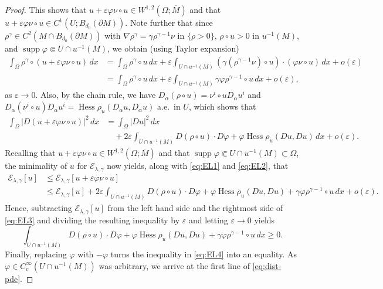 \documentclass[11pt]{amsart}
\newcommand{\cE}{{\mathcal E}}
\newcommand{\e}{\varepsilon}
\newcommand{\vp}{\varphi}
\newcommand{\supp}{\operatorname{supp}}
\newcommand{\Hess}{\operatorname{Hess}}
\theoremstyle{plain}
\theoremstyle{definition}
\theoremstyle{remark}
\numberwithin{equation}{section}
\begin{document}
\begin{proof}
This shows that $u + \e\vp\nu\circ u \in W^{1,2}(\Omega;\overline M)$ and that $u + \e\vp\nu\circ u\in C^1(U;B_{d_0}(\partial M))$. Note further that since $\rho^\gamma \in C^2(M\cap B_{d_0}(\partial M))$ with $\nabla\rho^\gamma = \gamma \rho^{\gamma-1}\nu$ in $\{\rho > 0\}$, $\rho\circ u > 0$ in $u^{-1}(M)$, and $\supp\vp \Subset U\cap u^{-1}(M)$, we obtain  (using Taylor expansion)
\begin{equation}
    \label{eq:EL1}
    \begin{aligned}
        \int_\Omega \rho^\gamma\circ (u + \e \vp\nu\circ u)\,dx &= \int_\Omega \rho^\gamma\circ u \,dx  + \e \int_{U\cap u^{-1}(M)} \left(\gamma (\rho^{\gamma-1}\nu)\circ u\right)\cdot \left(\varphi \nu\circ u\right)\,dx + o(\e) \\
        &= \int_\Omega \rho^\gamma\circ u \,dx  + \e \int_{U\cap u^{-1}(M)} \gamma \varphi\rho^{\gamma-1}\circ u\,dx + o(\e),
    \end{aligned}
\end{equation}
as $\e \to 0$. Also, by the chain rule, we have $D_\alpha(\rho\circ u) = \nu^i\circ u D_\alpha u^i$ and $D_\alpha (\nu^i\circ u)D_\alpha u^i = \Hess\rho_u(D_\alpha u,D_\alpha u)$ a.e.\ in $U$, which shows that 
\begin{equation}
    \label{eq:EL2}
    \begin{aligned}
        \int_\Omega |D ( u + \e \vp\nu\circ u)|^2 \,dx &= \int_\Omega |Du|^2 \,dx \\
        &\quad + 2\e \int_{U\cap u^{-1}(M)} D(\rho\circ u)\cdot D\vp + \vp \Hess\rho_u(Du,Du)\,dx + o(\e). 
    \end{aligned}
\end{equation}
Recalling that $u + \e \vp\nu\circ u \in W^{1,2}(\Omega;\overline M)$ and that $\supp \vp \Subset U\cap u^{-1}(M)\subset\Omega$, the minimality of $u$ for $\cE_{\lambda,\gamma}$ now yields, along with \eqref{eq:EL1} and \eqref{eq:EL2}, that 
\begin{equation}
    \label{eq:EL3}
    \begin{aligned}
        \cE_{\lambda,\gamma}[u] &\leq \cE_{\lambda,\gamma}[u + \e\vp\nu\circ u] \\
        & \leq \cE_{\lambda,\gamma}[u] + 2 \e \int_{U\cap u^{-1}(M)} D(\rho\circ u)\cdot D\vp + \vp \Hess\rho_u(Du,Du) + \gamma \varphi \rho^{\gamma-1}\circ u\,dx + o(\e).
    \end{aligned}
\end{equation}
Hence, subtracting $\cE_{\lambda,\gamma}[u]$ from the left hand side and the rightmost side of \eqref{eq:EL3} and dividing the resulting inequality by $\e$ and letting $\e\to 0$ yields 
\begin{equation}
    \label{eq:EL4}
    \int_{U\cap u^{-1}(M)} D(\rho\circ u)\cdot D\vp + \vp \Hess\rho_u(Du,Du) + \gamma \varphi  \rho^{\gamma-1}\circ u\,dx \geq 0. 
\end{equation}
Finally, replacing $\vp$ with $-\vp$ turns the inequality in \eqref{eq:EL4} into an equality. As $\vp\in C_c^\infty(U\cap u^{-1}(M))$ was arbitrary, we arrive at the first line of \eqref{eq:dist-pde}. 



\end{proof}
\end{document}
